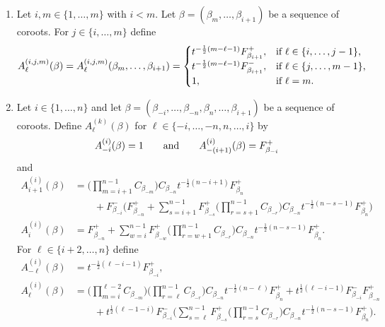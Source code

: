 \documentclass[11pt]{article}
\theoremstyle{plain}
\theoremstyle{definition}
\theoremstyle{remark}
\numberwithin{equation}{section}
\newcounter{r}
\newcounter{s}
\begin{document}
\smallskip\noindent
\begin{enumerate}
\item[(CS2)] Let $i,m\in \{1, \ldots, m\}$ with $i< m$.
Let $\beta=(\beta_m, \ldots, \beta_{i+1})$ be a sequence of coroots.  For $j\in \{i, \ldots, m\}$ define
\begin{equation}
A^{(i,j,m)}_\ell(\beta)
= A^{(i,j,m)}_\ell(\beta_m, \ldots, \beta_{i+1}) = \begin{cases}
t^{-\frac12(m-\ell-1)}F^+_{\beta_{i+1}}, &\hbox{if $\ell\in \{i,\ldots, j-1\}$,}  \\
t^{-\frac12(m-\ell-1)}F^-_{\beta_{i+1}}, &\hbox{if $\ell\in \{j, \ldots, m-1\}$,}  \\
1, &\hbox{if $\ell=m$.}
\end{cases}
\label{AEwts}
\end{equation}

\item[(CS1pre)]
Let $i\in \{1, \ldots, n\}$ and let $\beta = (\beta_{-i}, \ldots, \beta_{-n}, \beta_n, \ldots, \beta_{i+1} )$ be a sequence of coroots.
Define $A^{(k)}_\ell(\beta)$ for $\ell\in \{-i, \ldots, -n, n, \ldots, i\}$ by
\begin{equation}
A^{(i)}_{-i}(\beta) = 1 \qquad\hbox{and}\qquad
A^{(i)}_{-(i+1)}(\beta) = F^+_{\beta_{-i}}
\label{Adef1A}
\end{equation}
and
\begin{align}
A^{(i)}_{i+1}(\beta) 
&= 
\Big(\prod_{m=i+1}^{n-1} C_{\beta_{-m}}\Big) C_{\beta_{-n}}  t^{-\frac12 (n-i+1)} F_{\beta_n}^+
\nonumber \\
&\qquad
+F_{\beta_{-i}}^-
\Big(
F_{\beta_{-n}}^+ 
+ \sum_{s=i+1}^{n-1} F^+_{\beta_{-s}}
\Big(\prod_{r=s+1}^{n-1} C_{\beta_{-r}}\Big) C_{\beta_{-n}}  t^{-\frac12 (n-s-1)} F_{\beta_n}^+
 \Big)
\nonumber \\
A^{(i)}_i(\beta)
&=
F_{\beta_{-n}}^+ 
+ \sum_{w=i}^{n-1} F^+_{\beta_{-w}}
\Big(\prod_{r=w+1}^{n-1} C_{\beta_{-r}}\Big) C_{\beta_{-n}} t^{-\frac12 (n-s-1)} F_{\beta_n}^+.
\label{Adef1B}
\end{align}
For $\ell\in \{i+2, \ldots, n\}$ define
\begin{align}
A_{-\ell}^{(i)}(\beta) &= t^{-\frac12 (\ell-i-1)} F^+_{\beta_{-i}}, 
\nonumber \\
A_\ell^{(i)}(\beta) &= \Big(\prod_{m=i}^{\ell-2} C_{\beta_{-m}}\Big) \Big(\prod_{r=\ell}^{n-1} C_{\beta_{-r}}\Big) C_{\beta_{-n}}
t^{-\frac12 (n-\ell)} F^+_{\beta_n}
+ t^{\frac12 (\ell-i-1)} 
F^-_{\beta_{-i}}F_{\beta_{-n}}^+  
\nonumber  \\
&\qquad +t^{\frac12 (\ell-1-i)}
F^-_{\beta_{-i}}
\Big(\sum_{s=\ell}^{n-1} F^+_{\beta_{-s}}
\Big(\prod_{r=s}^{n-1} C_{\beta_{-r}}\Big) C_{\beta_{-n}}
t^{-\frac12 (n-s-1)} F^+_{\beta_n}
\Big).
\label{Adef1C}
\end{align}


\end{enumerate}
\end{document}
